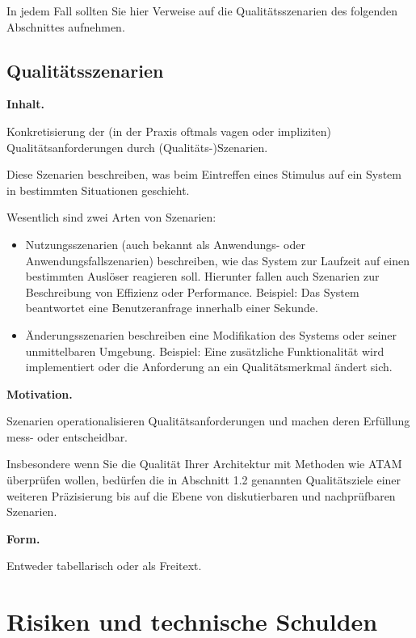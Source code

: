 \documentclass[]{article}
\begin{document}
In jedem Fall sollten Sie hier Verweise auf die Qualitätsszenarien des
folgenden Abschnittes aufnehmen.

\hypertarget{_qualit_tsszenarien}{%
\subsection{Qualitätsszenarien}\label{_qualit_tsszenarien}}

\textbf{Inhalt.}

Konkretisierung der (in der Praxis oftmals vagen oder impliziten)
Qualitätsanforderungen durch (Qualitäts-)Szenarien.

Diese Szenarien beschreiben, was beim Eintreffen eines Stimulus auf ein
System in bestimmten Situationen geschieht.

Wesentlich sind zwei Arten von Szenarien:

\begin{itemize}
\item
  Nutzungsszenarien (auch bekannt als Anwendungs- oder
  Anwendungsfallszenarien) beschreiben, wie das System zur Laufzeit auf
  einen bestimmten Auslöser reagieren soll. Hierunter fallen auch
  Szenarien zur Beschreibung von Effizienz oder Performance. Beispiel:
  Das System beantwortet eine Benutzeranfrage innerhalb einer Sekunde.
\item
  Änderungsszenarien beschreiben eine Modifikation des Systems oder
  seiner unmittelbaren Umgebung. Beispiel: Eine zusätzliche
  Funktionalität wird implementiert oder die Anforderung an ein
  Qualitätsmerkmal ändert sich.
\end{itemize}

\textbf{Motivation.}

Szenarien operationalisieren Qualitätsanforderungen und machen deren
Erfüllung mess- oder entscheidbar.

Insbesondere wenn Sie die Qualität Ihrer Architektur mit Methoden wie
ATAM überprüfen wollen, bedürfen die in Abschnitt 1.2 genannten
Qualitätsziele einer weiteren Präzisierung bis auf die Ebene von
diskutierbaren und nachprüfbaren Szenarien.

\textbf{Form.}

Entweder tabellarisch oder als Freitext.

\hypertarget{section-technical-risks}{%
\section{Risiken und technische
Schulden}\label{section-technical-risks}}
\end{document}
